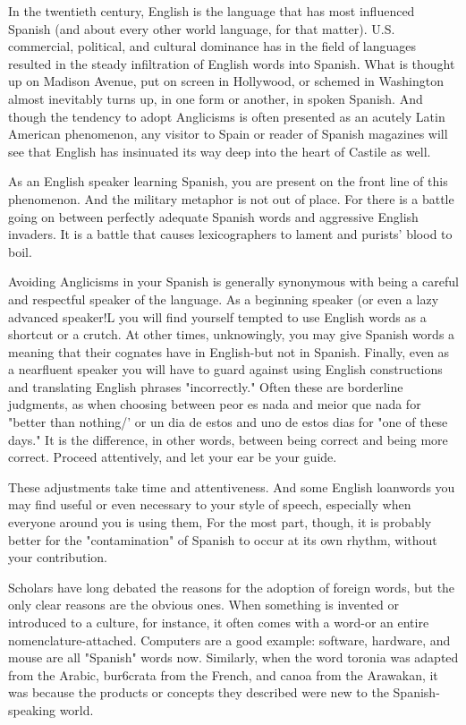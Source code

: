 \documentclass[14pt,a4paper,oneside]{memoir}
\begin{document}
{{{{In the twentieth century, English is the language that has most
influenced Spanish (and about every other world language, for that matter). U.S. commercial, political, and cultural dominance has in the field
of languages resulted in the steady infiltration of English words into
Spanish. What is thought up on Madison Avenue, put on screen in
Hollywood, or schemed in Washington almost inevitably turns up, in
one form or another, in spoken Spanish. And though the tendency to
adopt Anglicisms is often presented as an acutely Latin American phenomenon, any visitor to Spain or reader of Spanish magazines will see
that English has insinuated its way deep into the heart of Castile
as well.

As an English speaker learning Spanish, you are present on the
front line of this phenomenon. And the military metaphor is not out of
place. For there is a battle going on between perfectly adequate Spanish
words and aggressive English invaders. It is a battle that causes lexicographers to lament and purists' blood to boil.

Avoiding Anglicisms in your Spanish is generally synonymous
with being a careful and respectful speaker of the language. As a beginning speaker (or even a lazy advanced speaker!L you will find yourself
tempted to use English words as a shortcut or a crutch. At other times,
unknowingly, you may give Spanish words a meaning that their cognates have in English-but not in Spanish. Finally, even as a nearfluent speaker you will have to guard against using English constructions and translating English phrases "incorrectly." Often these are
borderline judgments, as when choosing between peor es nada and
meior que nada for "better than nothing/' or un dia de estos and
uno de estos dias for "one of these days." It is the difference, in other
words, between being correct and being more correct. Proceed attentively, and let your ear be your guide.

These adjustments take time and attentiveness. And some English loanwords you may find useful or even necessary to your style
of speech, especially when everyone around you is using them, For
the most part, though, it is probably better for the "contamination" of
Spanish to occur at its own rhythm, without your contribution.

Scholars have long debated the reasons for the adoption of
foreign words, but the only clear reasons are the obvious ones. When
something is invented or introduced to a culture, for instance, it often
comes with a word-or an entire nomenclature-attached. Computers
are a good example: software, hardware, and mouse are all "Spanish"
words now. Similarly, when the word toronia was adapted from the
Arabic, bur6crata from the French, and canoa from the Arawakan, it
was because the products or concepts they described were new to the
Spanish-speaking world.

}}}}
\end{document}
